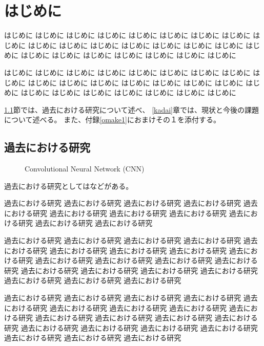 \section{はじめに}

はじめに はじめに はじめに はじめに はじめに はじめに はじめに はじめに 
はじめに はじめに はじめに はじめに はじめに はじめに はじめに はじめに 
はじめに はじめに はじめに はじめに はじめに はじめに はじめに はじめに 

はじめに はじめに はじめに はじめに はじめに はじめに はじめに はじめに 
はじめに はじめに はじめに はじめに はじめに はじめに はじめに はじめに 
はじめに はじめに はじめに はじめに はじめに はじめに はじめに はじめに 

\ref{kako}節では、過去における研究について述べ、
\ref{kadai}章では、現状と今後の課題について述べる。
また、付録\ref{omake1}におまけその１を添付する。


\subsection{過去における研究}
\label{kako}


\begin{figure*}[t]
 \centering
 \caption{Convolutional Neural Network (CNN)}
 \label{fig:CNN}
\end{figure*}

過去における研究としては\cite{alex_nips12}などがある。

過去における研究 過去における研究 過去における研究 
過去における研究 過去における研究 過去における研究 過去における研究 
過去における研究 過去における研究 過去における研究 過去における研究 

過去における研究 過去における研究 過去における研究 過去における研究 
過去における研究 過去における研究 過去における研究 過去における研究 
過去における研究 過去における研究 過去における研究 過去における研究 
過去における研究 過去における研究 過去における研究 過去における研究 
過去における研究 過去における研究 過去における研究 過去における研究 

過去における研究 過去における研究 過去における研究 過去における研究 
過去における研究 過去における研究 過去における研究 過去における研究 
過去における研究 過去における研究 過去における研究 過去における研究 
過去における研究 過去における研究 過去における研究 過去における研究 
過去における研究 過去における研究 過去における研究 過去における研究 

